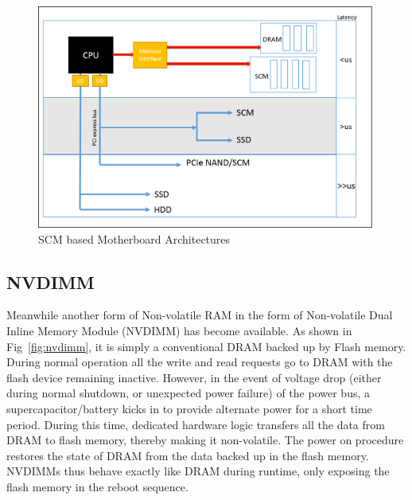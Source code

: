 \begin{figure}[H]
  \centering
  \includegraphics[scale=0.6]{figures/new_mem_arch.png}
  \caption{SCM based Motherboard Architectures}
  \label{fig:new_arch}
\end{figure}

\subsection{NVDIMM}
Meanwhile another form of Non-volatile RAM in the form of  Non-volatile Dual Inline Memory Module (NVDIMM) has become available. As shown in Fig~\ref{fig:nvdimm}, it is simply a conventional DRAM backed up by Flash memory. During normal operation all the write and read requests go to DRAM with the flash device remaining inactive. However, in the event of voltage drop (either during normal shutdown, or unexpected power failure) of the power bus, a supercapacitor/battery kicks in to provide alternate power for a short time period. During this time, dedicated hardware logic transfers all the data from DRAM to flash memory, thereby making it non-volatile. The power on procedure restores the state of DRAM from the data backed up in the flash memory. NVDIMMs thus behave exactly like DRAM during runtime, only exposing the flash memory in the reboot sequence. 

\setlength{\belowcaptionskip}{-10pt}

